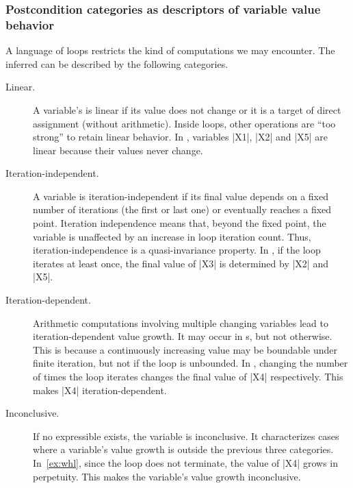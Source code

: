 \subsubsection{Postcondition categories as descriptors of variable value behavior}
\label{subsec:disclaimer}

A language of loops restricts the kind of computations we may encounter.
The inferred  can be described by the following categories.

\begin{description}

    \item[Linear.]
    A variable's  is linear if its value does not change or it is
    a target of direct assignment (without arithmetic). Inside loops, other
    operations are \enquote{too strong} to retain linear behavior. In \exname,
    variables \pr|X1|, \pr|X2| and \pr|X5| are linear because their values never
    change.

    \item[Iteration-independent.]
    A variable is iteration-independent if its final value depends on a fixed
    number of iterations (\eg the first or last one) or eventually reaches a
    fixed point. Iteration independence means
    that, beyond the fixed point, the variable is unaffected by an increase in
    loop iteration count. Thus, iteration-independence is
    a quasi-invariance property. In \exname, if the loop
    iterates at least once, the final value of \pr|X3| is determined by \pr|X2|
    and \pr|X5|.

    \item[Iteration-dependent.]
    Arithmetic computations involving multiple changing variables lead to
    iteration-dependent value growth. It may occur
    in s, but not otherwise. This is because a continuously
    increasing value may be boundable under finite iteration, but not if the
    loop is unbounded. In \explain, changing the number of
    times the loop iterates changes the final value of \pr|X4| respectively.
    This makes \pr|X4| iteration-dependent.

    \item[Inconclusive.]
    If no expressible  exists, the variable is inconclusive.
    It characterizes cases where a variable's value growth is outside the
    previous three categories. In~\autoref{ex:whl}, since the loop does not
    terminate, the value of \pr|X4| grows in perpetuity. This makes the
    variable's value growth inconclusive.

\end{description}

